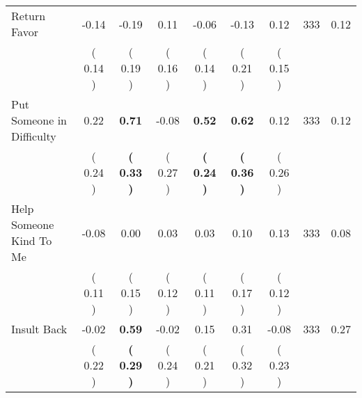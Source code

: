\begin{tabular}{lcccccccc}
Return Favor &     -0.14 &     -0.19 &      0.11 &     -0.06 &     -0.13 &      0.12 & 333 &       0.12 \\ 
 & (     0.14 ) & (     0.19 ) & (     0.16 ) & (     0.14 ) & (     0.21 ) & (     0.15 ) & \\
Put Someone in Difficulty &      0.22 & \textbf{     0.71} &     -0.08 & \textbf{     0.52} & \textbf{     0.62} &      0.12 & 333 &       0.12 \\ 
 & (     0.24 ) & \textbf{(     0.33 )} & (     0.27 ) & \textbf{(     0.24 )} & \textbf{(     0.36 )} & (     0.26 ) & \\
Help Someone Kind To Me &     -0.08 &      0.00 &      0.03 &      0.03 &      0.10 &      0.13 & 333 &       0.08 \\ 
 & (     0.11 ) & (     0.15 ) & (     0.12 ) & (     0.11 ) & (     0.17 ) & (     0.12 ) & \\
Insult Back &     -0.02 & \textbf{     0.59} &     -0.02 &      0.15 &      0.31 &     -0.08 & 333 &       0.27 \\ 
 & (     0.22 ) & \textbf{(     0.29 )} & (     0.24 ) & (     0.21 ) & (     0.32 ) & (     0.23 ) & \\
\bottomrule
\end{tabular}
